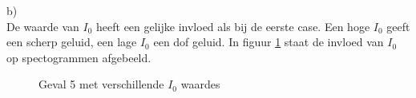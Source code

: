 \documentclass{article}
\begin{document}
b)\\
De waarde van $I_0$ heeft een gelijke invloed als bij de eerste case. Een hoge $I_0$ geeft een scherp geluid, een lage $I_0$ een dof geluid. In figuur \ref{fig:case5b} staat de invloed van $I_0$ op spectogrammen afgebeeld.

\begin{figure}[h]
  \centering
  \caption{Geval 5 met verschillende $I_0$ waardes}
  \label{fig:case5b}
\end{figure}
\end{document}
